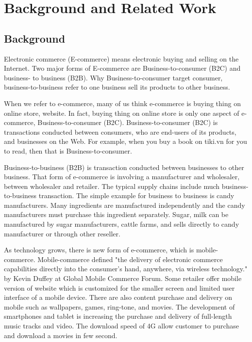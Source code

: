 \documentclass[conference]{IEEEtran}
\begin{document}


\section{Background and Related Work}
\subsection{Background}
Electronic commerce (E-commerce) means electronic buying and selling on the Internet. \cite{bidgoli2002electronic} Two major forms of E-commerce are Business-to-consumer (B2C) and business- to business (B2B). Why Business-to-consumer target consumer, business-to-business refer to one business sell its products to other business. \cite{readingEcommerce2009}

When we refer to e-commerce, many of us think e-commerce is buying thing on online store, website. In fact, buying thing on online store is only one aspect of e-commerce, Business-to-consumer (B2C). Business-to-consumer (B2C) is transactions conducted between consumers, who are end-users of its products, and businesses on the Web. \cite{ec2010Gary} For example, when you buy a book on tiki.vn for you to read, then that is Business-to-consumer.

Business-to-business (B2B) is transaction conducted between businesses to other business. \cite{ec2010Gary} That form of e-commerce is involving a manufacturer and wholesaler, between wholesaler and retailer. \cite{btb2015} The typical supply chains include much business-to-business transaction. \cite{btb2015} The simple example for business to business is candy manufacturers. Many ingredients are manufactured independently and the candy manufacturers must purchase this ingredient separately. Sugar, milk can be manufactured by sugar manufacturers, cattle farms, and sells directly to candy manufacturer or through other reseller.

As technology grows, there is new form of e-commerce, which is mobile-commerce. Mobile-commerce defined "the delivery of electronic commerce capabilities directly into the consumer’s hand, anywhere, via wireless technology." by Kevin Duffey at Global Mobile Commerce Forum. Some retailer offer mobile version of website which is customized for the smaller screen and limited user interface of a mobile device. \cite{ectomobile2015} There are also content purchase and delivery on mobile such as wallpapers, games, ring-tone, and movies. The development of smartphones and tablet is increasing the purchase and delivery of full-length music tracks and video. The download speed of 4G allow customer to purchase and download a movies in few second. \cite{niranjanamurthy2013analysis}
\end{document}
